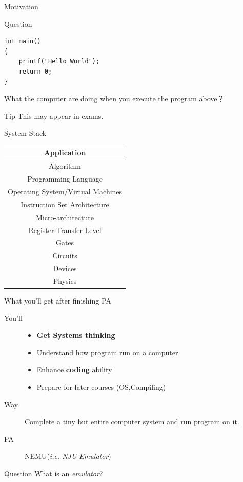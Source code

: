 \documentclass{beamer}
\begin{document}
\begin{frame}[fragile]{Motivation}
\begin{exampleblock}{Question}
\begin{verbatim}
int main()
{
    printf("Hello World");
    return 0;
}
\end{verbatim}
What the computer are doing when you execute the program above？
\end{exampleblock}

\begin{alertblock}{Tip}
	This may appear in exams.
\end{alertblock}

\end{frame}




\begin{frame}{System Stack}
\begin{table}
	\centering
	\begin{tabular}{|c|}
		\hline
		Application \\
		\hline
		Algorithm\\
		\hline
		Programming Language\\
		\hline
		Operating System/Virtual Machines\\
		\hline
		\alert{Instruction Set Architecture}		\\
		\hline
		Micro-architecture\\
		\hline
		Register-Transfer Level\\
		\hline
		Gates\\
		\hline
		Circuits\\
		\hline
		Devices\\
		\hline
		Physics\\
		\hline
	\end{tabular}
\end{table}
\end{frame}



\begin{frame}{What you'll get after finishing PA}
	\begin{description}
		\item[You'll]

		\begin{itemize}
		\item	\textbf{Get Systems thinking}
		\item	Understand how program run on a computer
		\item	Enhance \textbf{coding} ability
		\item	Prepare for later courses (OS,Compiling)
		\end{itemize}
		\pause
		\item[Way]Complete a tiny but entire computer system and run program on it.
		\pause
		\item[PA] \alert{\huge NEMU}(\textit{\uwave i.e. NJU Emulator})
	\end{description}
\begin{exampleblock}{Question}
	\huge What is an \textit{emulator}?
\end{exampleblock}
\end{frame}
\end{document}
